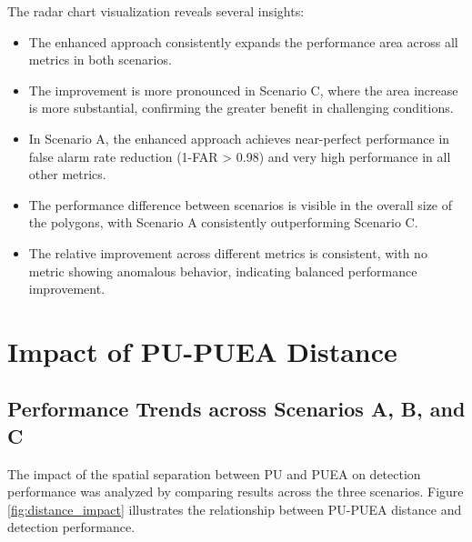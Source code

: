The radar chart visualization reveals several insights:

\begin{itemize}
    \item The enhanced approach consistently expands the performance area across all metrics in both scenarios.
    
    \item The improvement is more pronounced in Scenario C, where the area increase is more substantial, confirming the greater benefit in challenging conditions.
    
    \item In Scenario A, the enhanced approach achieves near-perfect performance in false alarm rate reduction (1-FAR > 0.98) and very high performance in all other metrics.
    
    \item The performance difference between scenarios is visible in the overall size of the polygons, with Scenario A consistently outperforming Scenario C.
    
    \item The relative improvement across different metrics is consistent, with no metric showing anomalous behavior, indicating balanced performance improvement.
\end{itemize}

\section{Impact of PU-PUEA Distance}

\subsection{Performance Trends across Scenarios A, B, and C}

The impact of the spatial separation between PU and PUEA on detection performance was analyzed by comparing results across the three scenarios. Figure \ref{fig:distance_impact} illustrates the relationship between PU-PUEA distance and detection performance.

